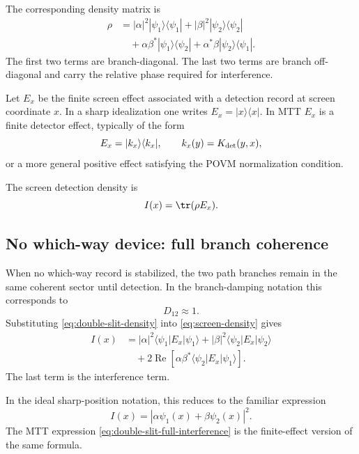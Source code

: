 \documentclass[11pt]{article}
\begin{document}
The corresponding density matrix is
\begin{align}
  \rho
  &=
  |\alpha|^2|\psi_1\rangle\langle\psi_1|
  +
  |\beta|^2|\psi_2\rangle\langle\psi_2|
  \nonumber\\
  &\quad+
  \alpha\beta^\ast|\psi_1\rangle\langle\psi_2|
  +
  \alpha^\ast\beta|\psi_2\rangle\langle\psi_1|.
  \label{eq:double-slit-density}
\end{align}
The first two terms are branch-diagonal. The last two terms are branch off-diagonal and carry
the relative phase required for interference.

Let \(E_x\) be the finite screen effect associated with a detection record at screen coordinate
\(x\). In a sharp idealization one writes \(E_x=|x\rangle\langle x|\). In MTT \(E_x\) is a
finite detector effect, typically of the form
\begin{equation}
  E_x=|k_x\rangle\langle k_x|,
  \qquad
  k_x(y)=K_{\rm det}(y,x),
  \label{eq:screen-effect}
\end{equation}
or a more general positive effect satisfying the POVM normalization condition.

The screen detection density is
\begin{equation}
  I(x)
  =
  \tr(\rho E_x).
  \label{eq:screen-density}
\end{equation}

\subsection{No which-way device: full branch coherence}
\label{subsec:no-which-way}

When no which-way record is stabilized, the two path branches remain in the same coherent
sector until detection. In the branch-damping notation this corresponds to
\begin{equation}
  D_{12}\approx1.
\end{equation}
Substituting \eqref{eq:double-slit-density} into \eqref{eq:screen-density} gives
\begin{align}
  I(x)
  &=
  |\alpha|^2\langle\psi_1|E_x|\psi_1\rangle
  +
  |\beta|^2\langle\psi_2|E_x|\psi_2\rangle
  \nonumber\\
  &\quad+
  2\operatorname{Re}
  \left[
    \alpha\beta^\ast
    \langle\psi_2|E_x|\psi_1\rangle
  \right].
  \label{eq:double-slit-full-interference}
\end{align}
The last term is the interference term.

In the ideal sharp-position notation, this reduces to the familiar expression
\begin{equation}
  I(x)
  =
  |\alpha\psi_1(x)+\beta\psi_2(x)|^2.
  \label{eq:double-slit-sharp}
\end{equation}
The MTT expression \eqref{eq:double-slit-full-interference} is the finite-effect version of
the same formula.
\end{document}
